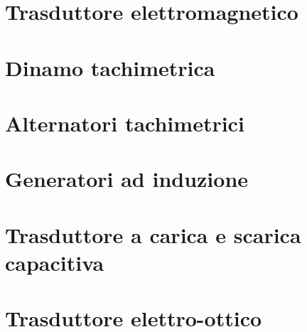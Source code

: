 \section{Trasduttore elettromagnetico}
\section{Dinamo tachimetrica}
\section{Alternatori tachimetrici}
\section{Generatori ad induzione}
\section{Trasduttore a carica e scarica capacitiva}
\section{Trasduttore elettro-ottico}
